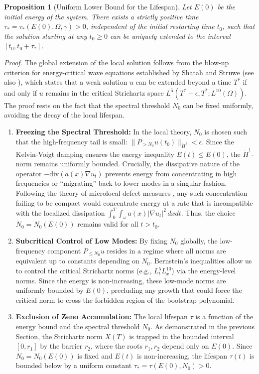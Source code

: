\documentclass[11pt,letterpaper]{amsart}
\newtheorem{proposition}[theorem]{Proposition}
\begin{document}
\begin{proposition}[Uniform Lower Bound for the Lifespan]
Let $E(0)$ be the initial energy of the system. There exists a strictly positive time $\tau_* = \tau_*(E(0), \Omega, \gamma) > 0$, independent of the initial restarting time $t_0$, such that the solution starting at any $t_0 \geq 0$ can be uniquely extended to the interval $[t_0, t_0 + \tau_*]$.
\end{proposition}

\noindent\textit{Proof.} The global extension of the local solution follows from the blow-up criterion for energy-critical wave equations established by Shatah and Struwe \cite{ShatahStruwe} (see also \cite{Kapitanskii1994}), which states that a weak solution $u$ can be extended beyond a time $T^*$ if and only if $u$ remains in the critical Strichartz space $L^5(T^*-\epsilon, T^*; L^{10}(\Omega))$. The proof rests on the fact that the spectral threshold $N_0$ can be fixed uniformly, avoiding the decay of the local lifespan.

\begin{enumerate}[label=(\roman*)]
    \item \textbf{Freezing the Spectral Threshold:} In the local theory, $N_0$ is chosen such that the high-frequency tail is small: $\|P_{> N_0} u(t_0)\|_{\dot{H}^1} < \epsilon$. Since the Kelvin-Voigt damping ensures the energy inequality $E(t) \leq E(0)$, the $\dot{H}^1$-norm remains uniformly bounded. Crucially, the dissipative nature of the operator $-\text{div}(a(x)\nabla u_t)$ prevents energy from concentrating in high frequencies or ``migrating'' back to lower modes in a singular fashion. Following the theory of microlocal defect measures \cite{Gerard}, any such concentration failing to be compact would concentrate energy at a rate that is incompatible with the localized dissipation $\int_0^T \int_\omega a(x) |\nabla u_t|^2 \, dx dt$. Thus, the choice $N_0 = N_0(E(0))$ remains valid for all $t > t_0$.

    \item \textbf{Subcritical Control of Low Modes:} By fixing $N_0$ globally, the low-frequency component $P_{\leq N_0} u$ resides in a regime where all norms are equivalent up to constants depending on $N_0$. Bernstein's inequalities allow us to control the critical Strichartz norms (e.g., $L^5_t L^{10}_x$) via the energy-level norms. Since the energy is non-increasing, these low-mode norms are uniformly bounded by $E(0)$, precluding any growth that could force the critical norm to cross the forbidden region of the bootstrap polynomial.

    \item \textbf{Exclusion of Zeno Accumulation:} The local lifespan $\tau$ is a function of the energy bound and the spectral threshold $N_0$. As demonstrated in the previous Section, the Strichartz norm $X(T)$ is trapped in the bounded interval $[0, r_1]$ by the barrier $r_2$, where the roots $r_1, r_2$ depend only on $E(0)$. Since $N_0 = N_0(E(0))$ is fixed and $E(t)$ is non-increasing, the lifespan $\tau(t)$ is bounded below by a uniform constant $\tau_* = \tau(E(0), N_0) > 0$.
\end{enumerate}
\end{document}

